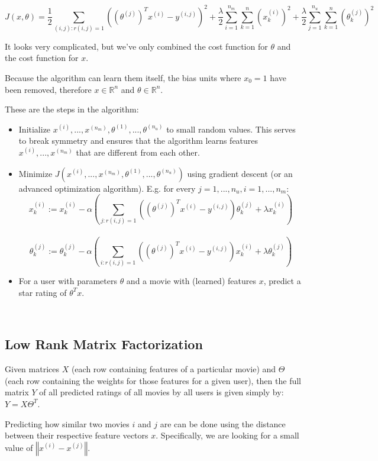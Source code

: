 \documentclass[a4paper,11pt]{report}
\newcommand{\norm}[1]{\left\Vert#1\right\Vert}
\begin{document}
$$J(x,\theta) = \dfrac{1}{2} \displaystyle \sum_{(i,j):r(i,j)=1}((\theta^{(j)})^Tx^{(i)} - y^{(i,j)})^2 + \dfrac{\lambda}{2}\sum_{i=1}^{n_m} \sum_{k=1}^{n} (x_k^{(i)})^2 + \dfrac{\lambda}{2}\sum_{j=1}^{n_u} \sum_{k=1}^{n} (\theta_k^{(j)})^2$$

It looks very complicated, but we've only combined the cost function for $\theta$ and the cost function for $x$.

Because the algorithm can learn them itself, the bias units where $x_0=1$ have been removed, therefore $x\in\mathbb{ℝ}^n$ and $\theta \in\mathbb{ℝ}^n$.

These are the steps in the algorithm:
\begin{itemize}
\item Initialize $x^{(i)},...,x^{(n_m)},\theta^{(1)},...,\theta^{(n_u)}$ to small random values. This serves to break symmetry and ensures that the algorithm learns features $x^{(i)},...,x^{(n_m)}$ that are different from each other.
\item Minimize $J(x^{(i)},...,x^{(n_m)},\theta^{(1)},...,\theta^{(n_u)})$ using gradient descent (or an advanced optimization algorithm). E.g. for every $j=1,...,n_u, i=1,...,n_m$:
$$x_k^{(i)} := x_k^{(i)} - \alpha\left (\displaystyle \sum_{j:r(i,j)=1}{((\theta^{(j)})^T x^{(i)} - y^{(i,j)}) \theta_k^{(j)}} + \lambda x_k^{(i)} \right)$$
​$$\theta_k^{(j)} := \theta_k^{(j)} - \alpha\left (\displaystyle \sum_{i:r(i,j)=1}{((\theta^{(j)})^T x^{(i)} - y^{(i,j)}) x_k^{(i)}} + \lambda \theta_k^{(j)} \right)$$
\item For a user with parameters $\theta$ and a movie with (learned) features $x$, predict a star rating of $\theta^Tx$.
​\end{itemize}​	

\subsection*{Low Rank Matrix Factorization}

Given matrices $X$ (each row containing features of a particular movie) and $\Theta$ (each row containing the weights for those features for a given user), then the full matrix $Y$ of all predicted ratings of all movies by all users is given simply by: $Y=X\Theta^T$.

Predicting how similar two movies $i$ and $j$ are can be done using the distance between their respective feature vectors $x$. Specifically, we are looking for a small value of $\norm{x^{(i)} - x^{(j)}}$.
\end{document}
